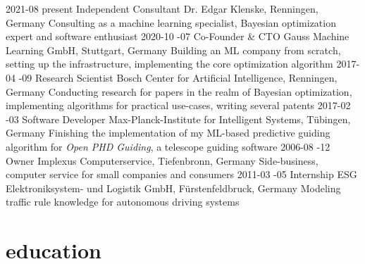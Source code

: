 \documentclass[a4paper]{k-cv} %
\begin{document}
\begin{entrylist}
  \entry
  {2021-08 \to present}
  {Independent Consultant}
  {Dr. Edgar Klenske, Renningen, Germany}
  {Consulting as a machine learning specialist, Bayesian optimization expert and
    software enthusiast}
  \entry
  {2020-10 -07}
  {Co-Founder \& CTO}
  {Gauss Machine Learning GmbH, Stuttgart, Germany}
  {Building an ML company from scratch, setting up the infrastructure,
    implementing the core optimization algorithm}
  \entry
  {2017-04 -09}
  {Research Scientist}
  {Bosch Center for Artificial Intelligence, Renningen, Germany}
  {Conducting research for papers in the realm of Bayesian optimization,
    implementing algorithms for practical use-cases, writing several patents}
  \entry
  {2017-02 -03}
  {Software Developer}
  {Max-Planck-Institute for Intelligent Systems, T\"ubingen, Germany}
  {Finishing the implementation of my ML-based predictive guiding algorithm for
    \emph{Open PHD Guiding}, a telescope guiding software}
  \entry
  {2006-08 -12}
  {Owner}
  {Implexus Computerservice, Tiefenbronn, Germany}
  {Side-business, computer service for small companies and consumers}
  \entry
  {2011-03 -05}
  {Internship}
  {ESG Elektroniksystem- und Logistik GmbH, F\"urstenfeldbruck, Germany}
  {Modeling traffic rule knowledge for autonomous driving systems}
\end{entrylist}

\section{education}\normalfont
\end{document}
